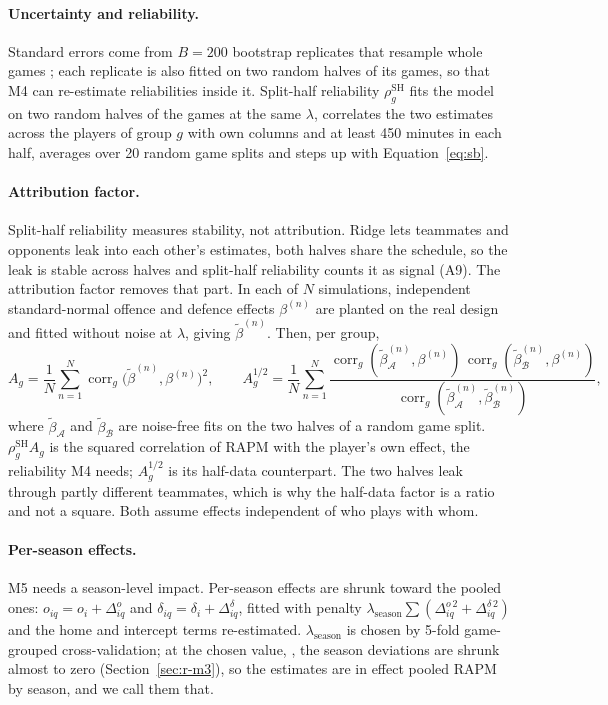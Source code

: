 \documentclass[11pt,a4paper]{article}
\DeclareMathOperator{\corr}{corr}
\begin{document}
\paragraph{Uncertainty and reliability.}
Standard errors come from $B = 200$ bootstrap replicates that resample whole
games \citep{efron1979bootstrap}; each replicate is also fitted on two random
halves of its games, so that M4 can re-estimate reliabilities inside it.
Split-half reliability $\rho^{\mathrm{SH}}_g$ fits the model on two random
halves of the games at the same $\lambda$, correlates the two estimates across
the players of group $g$ with own columns and at least 450 minutes in each
half, averages over 20 random game splits and steps up with
Equation~\eqref{eq:sb}.

\paragraph{Attribution factor.}
Split-half reliability measures stability, not attribution. Ridge lets
teammates and opponents leak into each other's estimates, both halves share
the schedule, so the leak is stable across halves and split-half reliability
counts it as signal (A9). The attribution factor removes that part. In each of
$N$ simulations, independent standard-normal offence and defence effects
$\beta^{(n)}$ are planted on the real design and fitted without noise at
$\lambda$, giving $\tilde\beta^{(n)}$. Then, per group,
\begin{equation}
  A_g = \frac{1}{N}\sum_{n=1}^{N} \corr_g\big(\tilde\beta^{(n)}, \beta^{(n)}\big)^2,
  \qquad
  A^{1/2}_g = \frac{1}{N}\sum_{n=1}^{N}
  \frac{\corr_g(\tilde\beta^{(n)}_{\mathcal A}, \beta^{(n)})\,\corr_g(\tilde\beta^{(n)}_{\mathcal B}, \beta^{(n)})}
       {\corr_g(\tilde\beta^{(n)}_{\mathcal A}, \tilde\beta^{(n)}_{\mathcal B})},
  \label{eq:attribution}
\end{equation}
where $\tilde\beta_{\mathcal A}$ and $\tilde\beta_{\mathcal B}$ are noise-free
fits on the two halves of a random game split. $\rho^{\mathrm{SH}}_g A_g$ is the
squared correlation of RAPM with the player's own effect, the reliability M4
needs; $A^{1/2}_g$ is its half-data counterpart. The two halves leak through
partly different teammates, which is why the half-data factor is a ratio and
not a square. Both assume effects independent of who plays with whom.

\paragraph{Per-season effects.}
M5 needs a season-level impact. Per-season effects are shrunk toward the
pooled ones: $o_{iq} = o_i + \Delta^{o}_{iq}$ and
$\delta_{iq} = \delta_i + \Delta^{\delta}_{iq}$, fitted with penalty
$\lambda_{\text{season}} \sum (\Delta^{o\,2}_{iq} + \Delta^{\delta\,2}_{iq})$ and
the home and intercept terms re-estimated. $\lambda_{\text{season}}$ is chosen
by 5-fold game-grouped cross-validation; at the chosen value,
\RapmLambdaSeason{}, the season deviations are shrunk almost to zero
(Section~\ref{sec:r-m3}), so the estimates are in effect pooled RAPM by season,
and we call them that.
\end{document}
